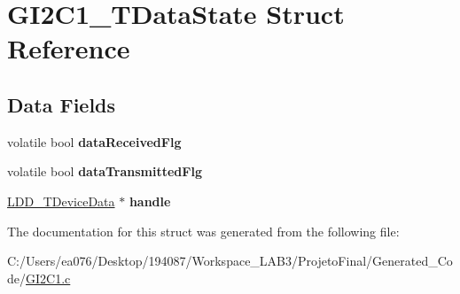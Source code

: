 \hypertarget{struct_g_i2_c1___t_data_state}{\section{G\-I2\-C1\-\_\-\-T\-Data\-State Struct Reference}
\label{struct_g_i2_c1___t_data_state}
}
\subsection*{Data Fields}
\begin{DoxyCompactItemize}
\item 
\hypertarget{struct_g_i2_c1___t_data_state_a502217a0e3bac66504cfd880ec11b550}{volatile bool {\bfseries data\-Received\-Flg}}\label{struct_g_i2_c1___t_data_state_a502217a0e3bac66504cfd880ec11b550}

\item 
\hypertarget{struct_g_i2_c1___t_data_state_a933946f038696bcecd95d537595a385f}{volatile bool {\bfseries data\-Transmitted\-Flg}}\label{struct_g_i2_c1___t_data_state_a933946f038696bcecd95d537595a385f}

\item 
\hypertarget{struct_g_i2_c1___t_data_state_a933ae3c2ed072d05ef6a601cc21f504f}{\hyperlink{group___p_e___types__module_gac5cf1362f1f0e3a2ce71b1bf2276d091}{L\-D\-D\-\_\-\-T\-Device\-Data} $\ast$ {\bfseries handle}}\label{struct_g_i2_c1___t_data_state_a933ae3c2ed072d05ef6a601cc21f504f}

\end{DoxyCompactItemize}


The documentation for this struct was generated from the following file\-:\begin{DoxyCompactItemize}
\item 
C\-:/\-Users/ea076/\-Desktop/194087/\-Workspace\-\_\-\-L\-A\-B3/\-Projeto\-Final/\-Generated\-\_\-\-Code/\hyperlink{_g_i2_c1_8c}{G\-I2\-C1.\-c}\end{DoxyCompactItemize}
